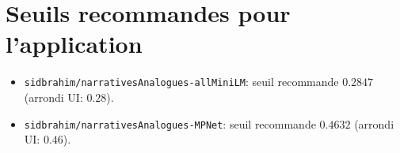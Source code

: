 \section{Seuils recommandes pour l'application}
\begin{itemize}[leftmargin=2em]
  \item \texttt{sidbrahim/narrativesAnalogues-allMiniLM}: seuil recommande \(0.2847\) (arrondi UI: \(0.28\)).
  \item \texttt{sidbrahim/narrativesAnalogues-MPNet}: seuil recommande \(0.4632\) (arrondi UI: \(0.46\)).
\end{itemize}
